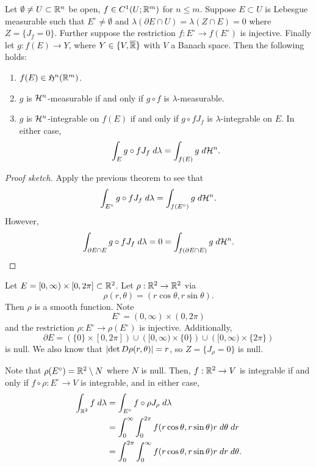 \documentclass[a4paper]{article}
\begin{document}
\begin{thm}
Let $\emptyset \neq U \subset \mathbb{R}^n$ be open, $f \in C^1
(U ; \mathbb{R}^m)$ for $n \leq m$. Suppose $E \subset U$ is Lebesgue
measurable such that $E^\circ \neq \emptyset$ and
$\lambda (\partial E \cap U) = \lambda (Z \cap E) = 0$
where $Z = \{J_f = 0\}$. Further suppose
the restriction $f : E^\circ \to f(E^\circ)$ is injective.
Finally let $g : f(E) \to Y$, where $Y \in \{V, \overline{\mathbb{R}}\}$
with $V$ a Banach space. Then the following holds:
\begin{enumerate}
\item $f(E) \in \mathfrak{H}^n (\mathbb{R}^m)$.
\item $g$ is $\mathcal{H}^n$-measurable if and only if
$g \circ f$ is $\lambda$-measurable.
\item $g$ is $\mathcal{H}^n$-integrable on $f(E)$
if and only if $g \circ f J_f$ is $\lambda$-integrable
on $E$. In either case,
\[
\int_E g \circ f J_f  \; d \lambda
= \int_{f(E)} g \; d \mathcal{H}^n.
\]
\end{enumerate}
\end{thm}

\begin{proof}[Proof sketch]
Apply the previous theorem to see that
\[
\int_{E^\circ} g \circ f J_f \; d \lambda
= \int_{f(E^\circ)} g \; d \mathcal{H}^n.
\]
However,
\[
\int_{\partial E \cap E} g \circ f J_f \; d \lambda
= 0 = \int_{f(\partial E \cap E)} g \; d \mathcal{H}^n.
\]
\end{proof}

\begin{eg}
Let $E = [0, \infty) \times [0, 2 \pi] \subset \mathbb{R}^2$.
Let $\rho: \mathbb{R}^2 \to \mathbb{R}^2$ via
\[
\rho(r, \theta) = (r \cos \theta, r \sin \theta).
\]
Then $\rho$ is a smooth function. Note
\[
E^\circ = (0, \infty) \times (0, 2\pi)
\]
and the restriction $\rho : E^\circ \to \rho(E^\circ)$ is
injective. Additionally,
\[
\partial E = \left( \{0\} \times [0, 2 \pi] \right) \cup
\left( [0, \infty) \times \{0\} \right) \cup
\left( [0, \infty) \times \{2 \pi\} \right)
\]
is null. We also know that $\left\lvert \det D\rho (r, \theta)\right\rvert = r$,
so $Z = \{J_\rho = 0\}$ is null.

Note that $\rho(E^\circ) = \mathbb{R}^2 \setminus N$
where $N$ is null. Then, $f : \mathbb{R}^2 \to V$ is integrable
if and only if $f \circ \rho : E^\circ \to V$ is integrable,
and in either case,
\[
\begin{aligned}
\int_{\mathbb{R}^2} f \; d \lambda
&= \int_{E^\circ} f \circ \rho J_{\rho}  \; d \lambda \\
&= \int_0^\infty \int_0^{2\pi} f(r \cos \theta, r \sin \theta)
r \; d \theta \; d r \\
&= \int_0^{2\pi} \int_0^\infty f(r \cos \theta, r \sin \theta)
r \; d r \; d \theta.
\end{aligned}
\]
\end{eg}
\end{document}
